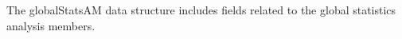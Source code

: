 The globalStatsAM data structure includes fields related to the global statistics analysis members.
